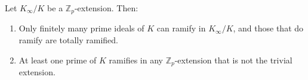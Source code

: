 Let $K_{\infty}/K$ be a $\mathbb{Z}_p$-extension. Then:
\begin{enumerate}
\item[(i)] Only finitely many prime ideals of $K$ can ramify in $K_{\infty}/K$, and those that do ramify are totally ramified.
\item[(ii)] At least one prime of $K$ ramifies in any $\mathbb{Z}_p$-extension that is not the trivial extension.
\end{enumerate}
